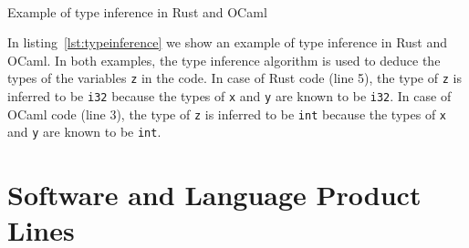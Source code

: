 \begin{Listing}[t]
    \centering
    \mbox{
        \quad
    }
    \caption{Example of type inference in Rust and OCaml}
    \label{lst:typeinference}
\end{Listing}

In listing~\ref{lst:typeinference} we show an example of type inference in Rust and OCaml. In both examples, the type inference algorithm is used to deduce the types of the variables \texttt{z} in the code. In case of Rust code (line 5), the type of \texttt{z} is inferred to be \texttt{i32} because the types of \texttt{x} and \texttt{y} are known to be \texttt{i32}. In case of OCaml code (line 3), the type of \texttt{z} is inferred to be \texttt{int} because the types of \texttt{x} and \texttt{y} are known to be \texttt{int}.

\section{Software and Language Product Lines}\label{sec:SoftwareProductLines}



